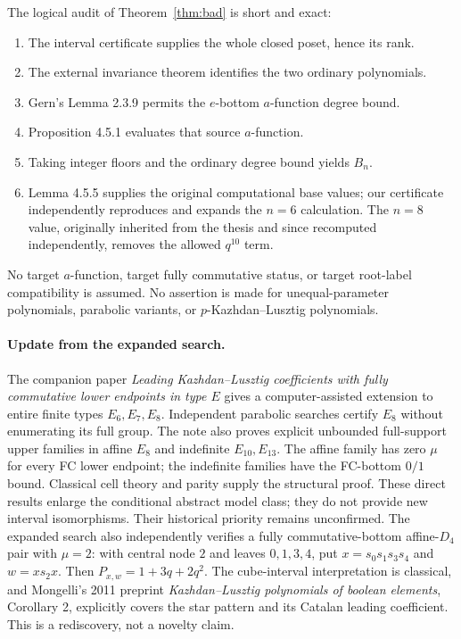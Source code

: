 \documentclass[11pt]{article}
\theoremstyle{definition}\newtheorem{definition}[theorem]{Definition}
\theoremstyle{remark}\newtheorem{remark}[theorem]{Remark}
\begin{document}
The logical audit of Theorem~\ref{thm:bad} is short and exact:
\begin{enumerate}
\item The interval certificate supplies the whole closed poset, hence its rank.
\item The external invariance theorem identifies the two ordinary polynomials.
\item Gern's Lemma 2.3.9 permits the $e$-bottom $a$-function degree bound.
\item Proposition 4.5.1 evaluates that source $a$-function.
\item Taking integer floors and the ordinary degree bound yields $B_n$.
\item Lemma 4.5.5 supplies the original computational base values;
our certificate independently reproduces and expands the $n=6$
calculation. The $n=8$ value, originally inherited from the thesis and
since recomputed independently, removes the allowed $q^{10}$ term.
\end{enumerate}
No target $a$-function, target fully commutative status, or
target root-label compatibility is assumed. No assertion is made
for unequal-parameter polynomials, parabolic variants, or
$p$-Kazhdan--Lusztig polynomials.

\paragraph{Update from the expanded search.}
The companion paper \emph{Leading Kazhdan--Lusztig coefficients with
fully commutative lower endpoints in type $E$} gives a
computer-assisted extension to entire finite types $E_6,E_7,E_8$.
Independent parabolic searches certify $E_8$ without enumerating its full
group. The note also proves explicit unbounded full-support upper families
in affine $E_8$ and indefinite $E_{10},E_{13}$. The affine family has zero
$\mu$ for every FC lower endpoint; the indefinite families have the FC-bottom
$0/1$ bound. Classical cell theory and parity supply the structural proof.
These direct results enlarge the conditional abstract model class; they do
not provide new interval isomorphisms. Their historical priority remains
unconfirmed. The expanded search also independently
verifies a fully commutative-bottom affine-$D_4$ pair with $\mu=2$:
with central node $2$ and leaves $0,1,3,4$, put $x=s_0s_1s_3s_4$ and
$w=xs_2x$. Then $P_{x,w}=1+3q+2q^2$. The cube-interval interpretation is
classical, and Mongelli's 2011 preprint \emph{Kazhdan--Lusztig polynomials
of boolean elements}, Corollary 2, explicitly covers the star pattern and
its Catalan leading coefficient. This is a rediscovery, not a novelty claim.
\end{document}
